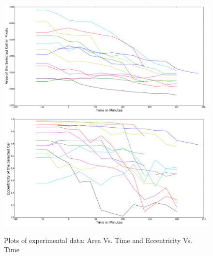 \documentclass[ twocolumn,notitlepage]{ revtex4-1}
\begin{document}
\begin{center}
\begin{figure}
\includegraphics[width=.95\textwidth]{img/mplAreaVsTime.pdf}
\includegraphics[width=.95\textwidth]{img/mplEccentricityVsTime.pdf}
\caption{\label{fig:resultPlots}Plots of experimental data: Area Vs. Time and Eccentricity Vs. Time}
\end{figure}
\end{center}


\end{document}
